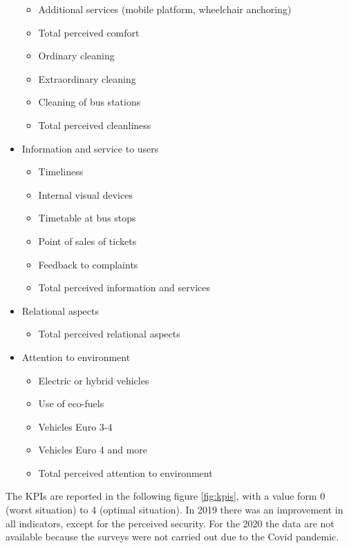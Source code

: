\begin{itemize}
\begin{itemize}
        \item Additional services (mobile platform, wheelchair anchoring)
        \item Total perceived comfort
        \item Ordinary cleaning
        \item Extraordinary cleaning
        \item Cleaning of bus stations
        \item Total perceived cleanliness
    \end{itemize}
    \item Information and service to users
    \begin{itemize}
        \item Timeliness
        \item Internal visual devices
        \item Timetable at bus stops
        \item Point of sales of tickets
        \item Feedback to complaints
        \item Total perceived information and services
    \end{itemize}
    \item Relational aspects
        \begin{itemize}
            \item         Total perceived relational aspects
        \end{itemize}
    \item Attention to environment
        \begin{itemize}
            \item Electric or hybrid vehicles 
            \item Use of eco-fuels
            \item Vehicles Euro 3-4
            \item Vehicles Euro 4 and more
            \item Total perceived attention to environment
        \end{itemize}
\end{itemize}

The KPIs are reported in the following figure \ref{fig:kpis}, with a value form 0 (worst situation) to 4 (optimal situation). In 2019 there was an improvement in all indicators, except for the perceived security. For the 2020 the data are not available because the surveys were not carried out due to the Covid pandemic.


